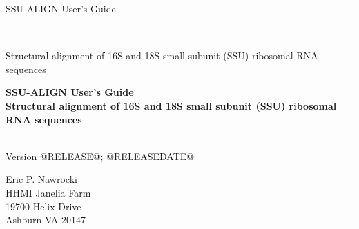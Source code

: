 \begin{titlepage}
{\Large

\vspace*{\fill}

\begin{latexonly}
\noindent
{\Huge \textsf{SSU-ALIGN User's Guide}} \\ 
\rule[2pt]{\textwidth}{1pt} \\
\hspace*{\fill} {\large \textsf{Structural alignment of 16S and 18S small subunit
    (SSU) ribosomal RNA sequences}\\}
\end{latexonly}

\begin{htmlonly}
\begin{center}
{\Huge \textbf{SSU-ALIGN User's Guide}}\\
{\large \textbf{Structural alignment of 16S and 18S small subunit
    (SSU) ribosomal RNA sequences}}\\
\end{center}
\end{htmlonly}

\vspace*{\fill}

\begin{center}
\textsl{}\\
Version @RELEASE@; @RELEASEDATE@ \\ 

\vspace*{\fill}

Eric P. Nawrocki\\
HHMI Janelia Farm\\
19700 Helix Drive\\
Ashburn VA 20147\\
\textsl{} \\
\end{center}

\vspace*{\fill}

}
\end{titlepage}
